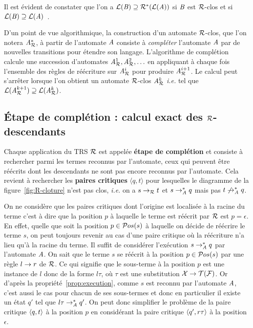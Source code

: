 Il est évident de constater que l'on a $\mathcal{L}(\mathit B) \supseteq \mathcal R^*(\mathcal{L}(\mathit A))$
si $\mathit B$ est $\mathcal R$-clos et si $\mathcal{L}(\mathit B)\supseteq \mathcal{L}(\mathit A)$~\cite{BoyerGJ-IJCAR08}.

D'un point de vue algorithmique, la construction d'un automate $\mathcal R$-clos, que l'on notera
${\mathit A}_{\mathcal R}^*$, à partir de l'automate $\mathit A$ consiste à \textit{compléter} l'automate $\mathit A$
par de nouvelles transitions pour étendre son langage. L'algorithme de complétion
calcule une succession d'automates ${\mathit A}_{\mathcal R}^1,{\mathit A}_{\mathcal R}^2,\ldots$ en appliquant à chaque fois
l'ensemble des règles de réécriture sur ${\mathit A}_{\mathcal R}^i$ pour produire ${\mathit A}_{\mathcal R}^{i+1}$.
Le calcul peut s'arrêter lorsque l'on obtient un automate $\mathcal R$-clos 
${\mathit A}_{\mathcal R}^k$ \textit{i.e.} tel que $\mathcal{L}({\mathit A}_{\mathcal R}^{k+1}) \supseteq \mathcal{L}({\mathit A}_{\mathcal R}^k)$.

\subsection{Étape de complétion : calcul exact des $\mathcal R$-descendants}


Chaque application du TRS $\mathcal R$ est appelée \textbf{étape de complétion} et 
consiste à rechercher parmi les termes reconnus par l'automate, ceux qui peuvent être réécrits
dont les descendants ne sont pas encore reconnus par l'automate.
Cela revient à rechercher les \textbf{paires critiques} $\langle q, t \rangle$ 
pour lesquelles le diagramme de la figure~\ref{fig:R-cloture} n'est pas clos, \textit{i.e.}
on a $s \rightarrow_\mathcal R t$ et $s \rightarrow_{\mathit A}^* q$ mais pas $t \not\rightarrow_{\mathit A}^* q$.

On ne considère que les paires critiques dont l'origine est localisée à la racine du terme c'est à dire
que la position $p$ à laquelle le terme est réécrit par $\mathcal R$ est $p = \epsilon$.
En effet, quelle que soit la position $p \in \mathcal{ P}os(s)$ à laquelle on décide de réécrire le terme
$s$, on peut toujours revenir au cas d'une paire critique où la réécriture n'a lieu qu'à la racine du terme.
Il suffit de considérer l'exécution $s \rightarrow_\mathit A^* q$ par l'automate $\mathit A$. 
On sait que le terme $s$ se réécrit à la position $p \in \mathcal{ P}os(s)$ par une règle $l \rightarrow r$ de $\mathcal R$. Ce qui signifie que le sous-terme à la 
position $p$ est une instance de $l$ donc de la forme $l\tau$, où $\tau$ est une substitution $\mathcal X \rightarrow \mathcal{T(F)}$.
Or d'après la propriété~\ref{prop:execution}, comme $s$ est reconnu par l'automate $\mathit A$, c'est aussi le cas pour chacun de ses sous-termes
et donc en particulier il existe un état $q'$ tel que $l\tau \rightarrow_\mathit A^* q'$. On peut donc simplifier le problème de la paire critique $\langle q, t\rangle$ à la position $p$
en considérant la paire critique $\langle q', r\tau\rangle$ à la position $\epsilon$.


